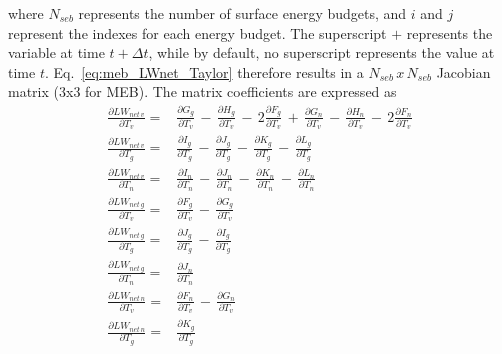{where $N_{seb}$ represents the number of surface energy budgets,
and $i$ and $j$ represent the indexes for each energy budget.
The superscript $+$ represents the variable at time $t+\Delta t$, while 
by default, no
superscript represents the value at time $t$.
%
Eq.~\ref{eq:meb_LWnet_Taylor} therefore results
in a 
$N_{seb} \,x\, N_{seb}$ Jacobian matrix (3x3 for MEB).
The matrix coefficients are expressed as
%
\begin{subequations}\label{eq:meb_lw_gn_terms_derivs}
\begin{align}
 \label{eq:meb_lw_dlwnetv_dtv}
{\frac{\partial LW_{net\,v}}{\partial T_v}} = & 
       {\frac{\partial G_{g}}{\partial T_v}}  
\,-\,  {\frac{\partial H_{g}}{\partial T_v}}  
\,-\, 2{\frac{\partial F_{g}}{\partial T_v}}  
\,+\,  {\frac{\partial G_{n}}{\partial T_v}}  
\,-\,  {\frac{\partial H_{n}}{\partial T_v}}  
\,-\, 2{\frac{\partial F_{n}}{\partial T_v}}  
\\
 \label{eq:meb_lw_dlwnetv_dtg}
{\frac{\partial LW_{net\,v}}{\partial T_g}} = & 
       {\frac{\partial I_{g}}{\partial T_g}}  
\,-\,  {\frac{\partial J_{g}}{\partial T_g}}  
\,-\,  {\frac{\partial K_{g}}{\partial T_g}}  
\,-\,  {\frac{\partial L_{g}}{\partial T_g}}  
\\
 \label{eq:meb_lw_dlwnetv_dtn}
{\frac{\partial LW_{net\,v}}{\partial T_n}} = & 
       {\frac{\partial I_{n}}{\partial T_n}}  
\,-\,  {\frac{\partial J_{n}}{\partial T_n}}  
\,-\,  {\frac{\partial K_{n}}{\partial T_n}}  
\,-\,  {\frac{\partial L_{n}}{\partial T_n}}  
\\
 \label{eq:meb_lw_dlwnetg_dtv}
{\frac{\partial LW_{net\,g}}{\partial T_v}} = & 
       {\frac{\partial F_{g}}{\partial T_v}}  
\,-\,  {\frac{\partial G_{g}}{\partial T_v}}  
\\
 \label{eq:meb_lw_dlwnetg_dtg}
{\frac{\partial LW_{net\,g}}{\partial T_g}} = & 
       {\frac{\partial J_{g}}{\partial T_g}}  
\,-\,  {\frac{\partial I_{g}}{\partial T_g}}  
\\
 \label{eq:meb_lw_dlwnetg_dtn}
{\frac{\partial LW_{net\,g}}{\partial T_n}} = & 
       {\frac{\partial J_{n}}{\partial T_n}}  
\\
 \label{eq:meb_lw_dlwnetn_dtv}
{\frac{\partial LW_{net\,n}}{\partial T_v}} = & 
       {\frac{\partial F_{n}}{\partial T_v}}  
\,-\,  {\frac{\partial G_{n}}{\partial T_v}}  
\\
 \label{eq:meb_lw_dlwnetn_dtg}
{\frac{\partial LW_{net\,n}}{\partial T_g}} = & 
       {\frac{\partial K_{g}}{\partial T_g}}  

\end{align}
\end{subequations}}
